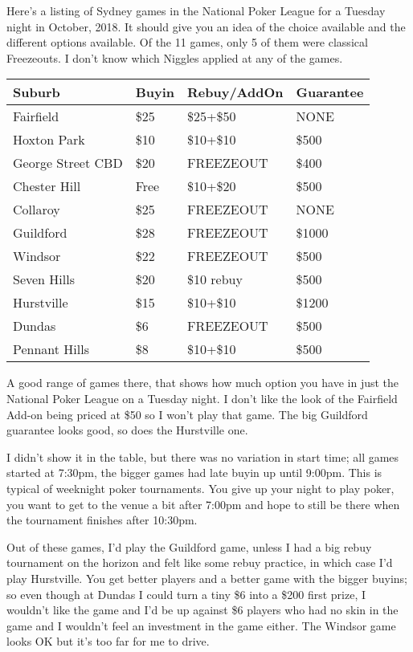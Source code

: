 Here's a listing of Sydney games in the National Poker League
for a Tuesday night in October, 2018. It should give you an
idea of the choice available and the different options available.
Of the 11 games, only 5 of them were classical Freezeouts.
I don't know which Niggles applied at any of the games.


\begin{tabular}{|l|l|l|l|} \hline
Suburb & Buyin & Rebuy/AddOn & Guarantee \\ \hline
Fairfield        & \$25 & \$25+\$50 & NONE \\ \hline
Hoxton Park       & \$10 & \$10+\$10 & \$500 \\ \hline
George Street CBD & \$20 & FREEZEOUT & \$400 \\ \hline
Chester Hill & Free & \$10+\$20 & \$500 \\ \hline
Collaroy & \$25 & FREEZEOUT & NONE \\ \hline
Guildford & \$28 & FREEZEOUT & \$1000 \\ \hline
Windsor & \$22 & FREEZEOUT & \$500 \\ \hline
Seven Hills & \$20 & \$10 rebuy & \$500 \\ \hline
Hurstville & \$15 & \$10+\$10 & \$1200 \\ \hline
Dundas & \$6 & FREEZEOUT & \$500 \\ \hline
Pennant Hills & \$8 & \$10+\$10 & \$500 \\ \hline
\end{tabular}

A good range of games there, that shows how much option you
have in just the National Poker League on a Tuesday night.
I don't like the look of the Fairfield Add-on being priced at \$50
so I won't play that game. The big Guildford guarantee looks
good, so does the Hurstville one.

I didn't show it in the table, but there was no variation in start
time; all games started at 7:30pm, the bigger games had late buyin
up until 9:00pm. This is typical of weeknight poker
tournaments. You give up your night to play poker,
you want to get to the venue a bit after 7:00pm and hope to still
be there when the tournament finishes after 10:30pm.

Out of these games, I'd play the Guildford game, unless I had a big
rebuy tournament on the horizon and felt like some rebuy practice, in
which case I'd play Hurstville. You get better players and a better
game with the bigger buyins; so even though at Dundas I could turn a
tiny \$6 into a \$200 first prize, I wouldn't like the game and I'd be
up against \$6 players who had no skin in the game
and I wouldn't feel an investment in the game either. The Windsor game
looks OK but it's too far for me to drive.

